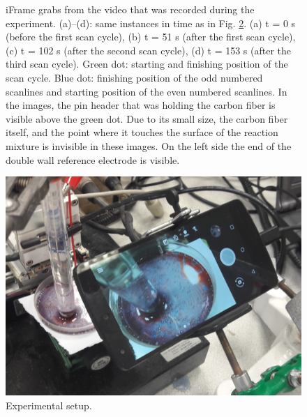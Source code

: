 \documentclass[3p, twocolumn]{elsarticle}
\begin{document}
\begin{figure}
\centering
{}
\caption{iFrame grabs from the video that was recorded during the experiment.
(a)--(d): same instances in time as in Fig. \ref{fig:spatiotemporal}.
(a) t = 0 s (before the first scan cycle), (b) t = 51 s (after the first scan cycle), (c) t = 102 s (after the second scan cycle), (d) t = 153 s (after the third scan cycle).
Green dot: starting and finishing position of the scan cycle.
Blue dot: finishing position of the odd numbered scanlines and starting position of the even numbered scanlines.
In the images, the pin header that was holding the carbon fiber is visible above the green dot.
Due to its small size, the carbon fiber itself, and the point where it touches the surface of the reaction mixture is invisible in these images.
On the left side the end of the double wall reference electrode is visible.}
\label{fig:grabs2}
\end{figure}


\begin{figure}

\centering
\includegraphics[width=\s\textwidth]{setup_photo.jpg}
\caption{Experimental setup.}
\label{fig:spatiotemporal}
\end{figure}
\end{document}

